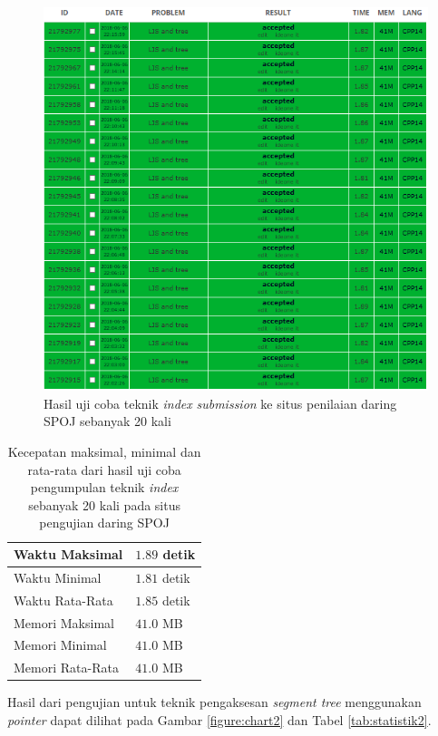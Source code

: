 \documentclass[a4paper]{IEEEtran}
\begin{document}
\begin{figure}[H]
	\centering
	\includegraphics[width=\linewidth]{images/20accST.PNG}
	\caption{Hasil uji coba teknik \textit{index} \textit{submission} ke situs penilaian daring SPOJ sebanyak 20 kali}
	\label{figure:chart}
\end{figure}
\begin{table}[H]
	\centering
	\begin{tabular}{|l|l|} \hline
		Waktu Maksimal & $ 1.89 $ detik\\ \hline
		Waktu Minimal & $ 1.81 $ detik\\ \hline
		Waktu Rata-Rata & $ 1.85 $ detik\\ \hline
		Memori Maksimal & $ 41.0 $ MB\\ \hline
		Memori Minimal & $ 41.0 $ MB\\ \hline
		Memori Rata-Rata & $ 41.0 $ MB\\ \hline
	\end{tabular}
	\caption{Kecepatan maksimal, minimal dan rata-rata dari hasil uji coba pengumpulan teknik \textit{index} sebanyak 20 kali pada situs pengujian daring SPOJ}
	\label{tab:statistik1}
\end{table}
Hasil dari pengujian untuk teknik pengaksesan \textit{segment tree} menggunakan \textit{pointer} dapat dilihat pada Gambar \ref{figure:chart2} dan Tabel \ref{tab:statistik2}.
\end{document}
